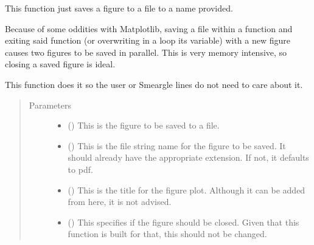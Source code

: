 \documentclass[letterpaper,10pt,english]{sphinxmanual}
\begin{document}
\begin{fulllineitems}
\label{\detokenize{python_docstrings/IfA_Smeargle.meta.plotting:IfA_Smeargle.meta.plotting.smeargle_save_figure_file}}
This function just saves a figure to a file to a name provided.

Because of some oddities with Matplotlib, saving a file within a function
and exiting said function (or overwriting in a loop its variable) with a
new figure causes two figures to be saved in parallel. This is very
memory intensive, so closing a saved figure is ideal.

This function does it so the user or Smeargle lines do not need to care
about it.
\begin{quote}\begin{description}
\item[{Parameters}] \leavevmode\begin{itemize}
\item {} 
 () \textendash{} This is the figure to be saved to a file.

\item {} 
 () \textendash{} This is the file string name for the figure to be saved. It should
already have the appropriate extension. If not, it defaults to pdf.

\item {} 
 (\sphinxstyleliteralemphasis{\sphinxupquote{ (}}\sphinxstyleliteralemphasis{\sphinxupquote{)}}) \textendash{} This is the title for the figure plot. Although it can be added from
here, it is not advised.

\item {} 
 (\sphinxstyleliteralemphasis{\sphinxupquote{ (}}\sphinxstyleliteralemphasis{\sphinxupquote{)}}) \textendash{} This specifies if the figure should be closed. Given that this
function is built for that, this should not be changed.


\end{itemize}
\end{description}
\end{quote}
\end{fulllineitems}
\end{document}
